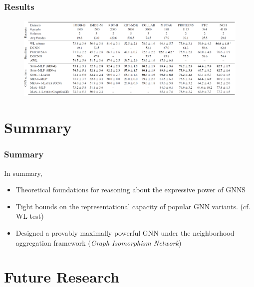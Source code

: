 \documentclass{beamer}
\begin{document}
\begin{frame}
\frametitle{Results}

\begin{figure}[hbt]
  \includegraphics[height=4cm]{fig6.png}
\end{figure}

\end{frame}


\section{Summary}

\begin{frame}
\frametitle{Summary}

In summary, \pause

\begin{itemize}
	\item Theoretical foundations for reasoning about the expressive power of GNNS \pause

	\item Tight bounds on the representational capacity of popular GNN variants. (cf. WL test) \pause

	\item Designed a provably maximally powerful GNN under the neighborhood aggregation framework ({\it Graph Isomorphism Network})
	
\end{itemize}

\end{frame}


\section{Future Research}
\end{document}
